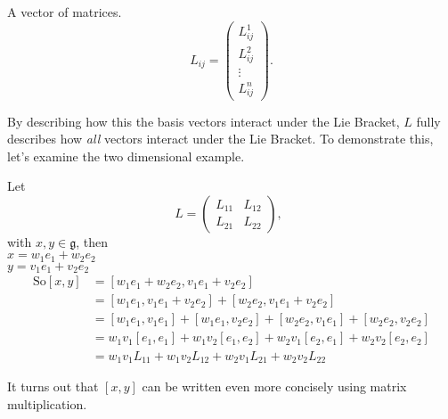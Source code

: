 \documentclass[11 pt]{article}
\newcommand{\br}[2]{\left[#1,#2\right]}
\newcommand{\fg}{\mathfrak{g}}
\begin{document}
    \vspace{3.15 cm}
    A vector of matrices.
    $$
    L_{ij} = \begin{pmatrix}
        L_{ij}^1 \\ L_{ij}^2 \\ \vdots \\ L_{ij}^n
    \end{pmatrix}.
    $$

    By describing how this the basis vectors interact under the Lie Bracket,
    $L$ fully describes how \emph{all} vectors interact under the Lie Bracket.
    To demonstrate this, let's examine the two dimensional example.

    \begin{example}
        Let
        $$
         L = \begin{pmatrix}
                L_{11} & L_{12} \\
                L_{21} & L_{22}
             \end{pmatrix},\ \ 
        $$
        with $x,y \in \fg$, then
        \\$x=w_1e_1 + w_2e_2$
        \\$y=v_1e_1 + v_2e_2$
        \begin{align*}
            \text{So} \br{x}{y} &= \br{w_1e_1 + w_2e_2}{v_1e_1 + v_2e_2}
            \\&= \br{w_1e_1}{v_1e_1 + v_2e_2} + \br{w_2e_2}{v_1e_1 + v_2e_2}
            \\&= \br{w_1e_1}{v_1e_1} + \br{w_1e_1}{v_2e_2}+ \br{w_2e_2}{v_1e_1} + \br{w_2e_2}{v_2e_2}
            \\&= w_1v_1\br{e_1}{e_1} + w_1v_2\br{e_1}{e_2}+ w_2v_1\br{e_2}{e_1} + w_2v_2\br{e_2}{e_2}
            \\&= w_1v_1L_{11} + w_1v_2L_{12} + w_2v_1L_{21}+ w_2v_2L_{22}
        \end{align*}
    \end{example}
    It turns out that $\br{x}{y}$ can be written even more concisely using
    matrix multiplication.
\end{document}
